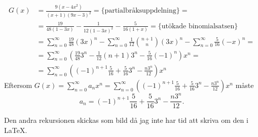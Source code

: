 \documentclass{article}
\begin{document}
\begin{equation}
	\begin{aligned}
	G(x) &= \frac{9\left( x-4x^2 \right) }{(x+1)(9x-3)^2} = \{\text{partialbråksuppdelning}\} =\\ &= \frac{19}{48(1-3x)} - \frac{1}{12(1-3x)^2} - \frac{5}{16(1+x)} = \{\text{utökade binomialsatsen}\}\\&=\sum\limits_{n=0}^{\infty} \frac{19}{48} (3x)^{n} - \sum\limits_{n=0}^\infty \frac{1}{12} {n+1 \choose n} (3x)^{n} - \sum\limits_{n=0}^\infty \frac{5}{16} (-x)^n =\\&= \sum\limits_{n=0}^\infty \left(\frac{19}{48} 3^{n} - \frac{1}{12} (n+1) 3^{n} - \frac{5}{16} (-1)^{n}\right)x^{n} =\\&= \sum\limits_{n=0}^\infty \left( (-1)^{n+1}\frac{5}{16} + \frac{5}{16}3^{n} - \frac{n 3^{n}}{12} \right)x^{n}
	\end{aligned}
\end{equation}
Eftersom $G(x)=\sum\limits_{n=0}^\infty a_n x^{n} = \sum\limits_{n=0}^\infty \left( (-1)^{n+1}\frac{5}{16} + \frac{5}{16}3^{n} - \frac{n 3^{n}}{12} \right)x^{n}$ måste
\[
a_n = (-1)^{n+1}\frac{5}{16} + \frac{5}{16}3^{n} - \frac{n 3^{n}}{12}
.\] 

Den andra rekursionen skickas som bild då jag inte har tid att skriva om den i \LaTeX.
\end{document}
